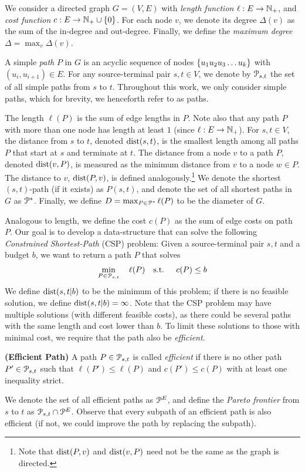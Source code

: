 
We consider a directed graph $G=(V,E)$ with \emph{length function} $\ell:E\to \N_+$, and \emph{cost function} $c:E\to \N_+\cup\{0\}$.
For each node $v$, we denote its degree $\Delta(v)$ as the sum of the in-degree and out-degree.
Finally, we define the \emph{maximum degree} $\Delta = \max_v\Delta(v)$.


A simple \emph{path} $P$ in $G$ is an acyclic sequence of nodes  $\crl*{u_1u_2u_3\ldots u_k}$ with $(u_i,u_{i+1})\in E$.
For any source-terminal pair $s,t\in V$, we denote by $\Pst$ the set of all simple paths from $s$ to $t$.
Throughout this work, we only consider simple paths, which for brevity, we henceforth refer to as paths.

The length $\ell(P)$ is the sum of edge lengths in $P$. Note also that any path $P$ with more than one node has length at least $1$ (since $\ell:E\to \N_+$).
For $s,t\in V$, the distance from $s$ to $t$, denoted $\dist(s,t)$, is the smallest length among all paths $P$ that start at $s$ and terminate at $t$.
The distance from a node $v$ to a path $P$, denoted $\dist(v,P)$, is measured as the minimum distance from $v$ to a node $w\in P$.
The distance to $v$, $\dist(P,v)$, is defined analogously.\footnote{Note that  $\dist(P,v)$ and  $\dist(v,P)$ need not be the same as the graph is directed.}
We denote the shortest $(s,t)$-path (if it exists) as $P(s,t)$, and denote the set of all shortest paths in $G$ as $\PS$.
Finally, we define $D=\max_{P\in\PS}\ell(P)$ to be the diameter of $G$.


Analogous to length, we define the cost $c(P)$ as the sum of edge costs on path $P$. 
Our goal is to develop a data-structure that can solve the following \emph{Constrained Shortest-Path} (CSP) problem: Given a source-terminal pair $s,t$ and a budget $b$, we want to return a path $P$ that solves
\begin{align*}
\min_{P \in \Pst}  \quad \ell(P) \quad
\text{s.t. } \quad  c(P) \leq b 
\end{align*}
We define $\dist(s,t|b)$ to be the minimum of this problem; if there is no feasible solution, we define $\dist(s,t|b)=\infty$.
Note that the CSP problem may have multiple solutions (with different feasible costs), as there could be several paths with the same length and cost lower than $b$.
To limit these solutions to those with minimal cost, we require that the path also be \emph{efficient}. 
\begin{definition}
\textbf{(Efficient Path)} A path $P\in \Pst$ is called \emph{efficient} if there is no other path $P'\in \Pst$ such that $\ell(P')\leq \ell(P)$ and $c(P')\leq c(P)$ with at least one inequality strict.
\end{definition}
We denote the set of all efficient paths as $\PE$, and define the \emph{Pareto frontier} from $s$ to $t$ as $\Pst\cap\PE$.
Observe that every subpath of an efficient path is also efficient (if not, we could improve the path by replacing the subpath).





